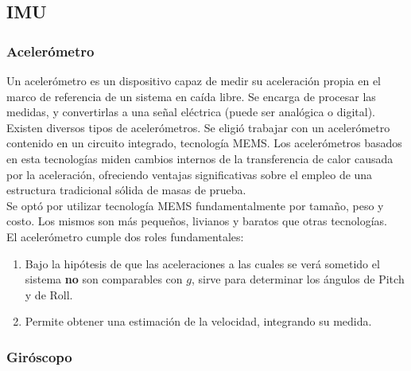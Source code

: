 \documentclass[main]{subfiles}
\begin{document}
\subsection{IMU}

\subsubsection{Aceler\'ometro}
\label{acelerometro}

Un aceler\'ometro es un dispositivo capaz de medir su aceleraci\'on propia en el marco de referencia de un sistema en ca\'ida libre. Se encarga de procesar las medidas, y convertirlas a una se\~nal el\'ectrica (puede ser anal\'ogica o digital).\\

Existen diversos tipos de aceler\'ometros. Se eligi\'o trabajar con un aceler\'ometro contenido en un circuito integrado, tecnolog\'ia MEMS. Los aceler\'ometros basados en esta tecnolog\'ias miden cambios internos de la transferencia de calor causada por la aceleraci\'on, ofreciendo ventajas significativas sobre el empleo de una estructura tradicional s\'olida de masas de prueba.\\

Se opt\'o por utilizar tecnolog\'ia MEMS fundamentalmente por tama\~no, peso y costo. Los mismos son m\'as peque\~nos, livianos y baratos que otras tecnolog\'ias.\\


El aceler\'ometro cumple dos roles fundamentales:
\begin{enumerate}
\item Bajo la hip\'otesis de que las aceleraciones a las cuales se ver\'a sometido el sistema \textbf{no} son comparables con $g$, sirve para determinar los \'angulos de Pitch y de Roll.
\item Permite obtener una estimaci\'on de la velocidad, integrando su medida.  
\end{enumerate}

 
\subsubsection{Gir\'oscopo}
\label{giro}
\end{document}
